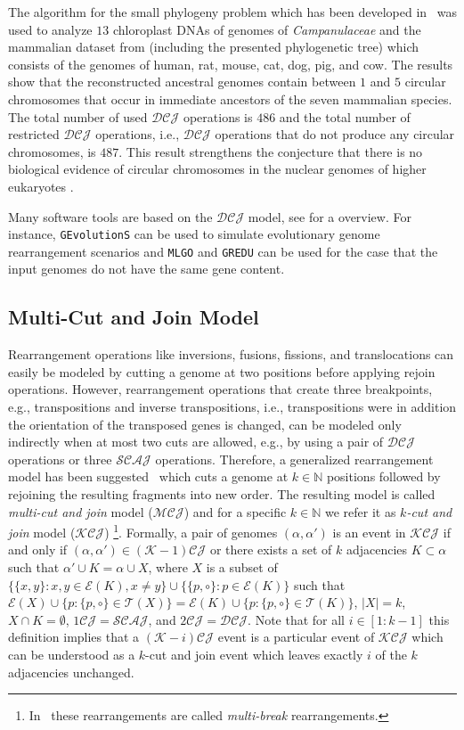 \documentclass{svmult}
\newcommand{\m}[1]{\mathcal{#1}}
\begin{document}
The algorithm for the small phylogeny problem which has been developed
in~\cite{Adam_2008} was used to analyze $13$ chloroplast DNAs of genomes of 
\emph{Campanulaceae} and the mammalian dataset from \cite{Murphy_2005}
(including the presented phylogenetic tree)  which consists of the genomes of
human, rat, mouse, cat, dog, pig, and cow.
The results show that the reconstructed ancestral genomes contain between $1$
and $5$ circular chromosomes that occur in immediate ancestors of the seven
mammalian species. The total number of used $\m{DCJ}$ operations is $486$ and 
the total number of restricted $\m{DCJ}$ operations, i.e., $\m{DCJ}$
operations that do not produce any circular chromosomes, is $487$.
This result strengthens the conjecture that there is no biological evidence of circular chromosomes in the
nuclear genomes of higher eukaryotes \cite{Brown_2006}.

Many software tools are based on the $\m{DCJ}$ model, see  for a overview.
For instance, \texttt{GEvolutionS} can be used to simulate evolutionary
genome rearrangement scenarios and  \texttt{MLGO} and \texttt{GREDU} can be
used for the case that the input genomes do not have the same gene content.

\subsection{Multi-Cut and Join Model}

Rearrangement operations like inversions, fusions, fissions, and translocations
can easily be modeled by cutting a genome at two positions before applying rejoin operations. However, rearrangement 
operations that create three breakpoints, e.g., transpositions and inverse
transpositions, i.e., transpositions were in addition the orientation of the
transposed genes is changed, can be modeled only indirectly when at most two cuts are allowed, e.g., 
by using a pair of $\m{DCJ}$ operations or three $\m{SCAJ}$ operations.
%
Therefore, a generalized rearrangement model has been suggested~\cite{Alekseyev_2008} which cuts a genome at 
$k\in \mathbb{N}$ positions followed by rejoining the resulting fragments into new order.
The resulting model is called \emph{multi-cut and join} model ($\m{MCJ}$) 
and for a specific $k\in \mathbb{N}$ we refer it as 
\emph{$k$-cut and join} model ($\m{KCJ}$)
\footnote{
In~\cite{Alekseyev_2008} these rearrangements are called \emph{multi-break} 
rearrangements.}.
Formally, a pair of genomes $(\alpha,\alpha')$ is an event in $\m{KCJ}$ if and
only if $(\alpha,\alpha')\in (\m{K}-1)\m{CJ}$ or there exists a set of $k$
adjacencies $K \subset \alpha$ such that $\alpha' \cup
K = \alpha \cup X$, where $X$ is a subset of $\{\{x,y\}:x,y\in
\m{E}(K), x\neq y\}\cup \{\{p,\circ \}:p\in \m{E}(K)\}$ such that
$\m{E}(X)\cup \{p:\{p,\circ \}\in \mathcal{T}(X)\}=\m{E}(K)\cup \{p:\{p,\circ \}\in \mathcal{T}(K)\}$, $|X|=k$, $X\cap K = \emptyset$,
$1\m{CJ}=\m{SCAJ}$, and $2\m{CJ}=\m{DCJ}$.
Note that for all $i\in [1:k-1]$ this definition implies that a
$(\m{K}-i)\m{CJ}$ event is a particular event of $\m{KCJ}$ which can be
understood as a $k$-cut and join event which leaves exactly $i$ of the $k$ adjacencies unchanged.
\end{document}
